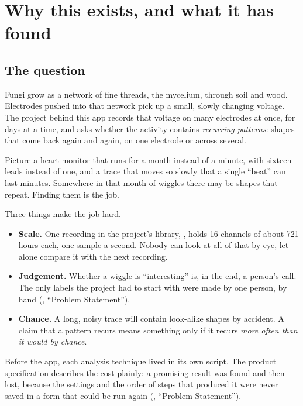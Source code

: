 \chapter{Why this exists, and what it has found}\label{ch:why}
\section{The question}\label{sec:why-question}
Fungi grow as a network of fine threads, the mycelium, through soil and wood. Electrodes
pushed into that network pick up a small, slowly changing voltage. The project behind this
app records that voltage on many electrodes at once, for days at a time, and asks whether
the activity contains \emph{recurring patterns}: shapes that come back again and again, on
one electrode or across several.

\begin{plainterms}
Picture a heart monitor that runs for a month instead of a minute, with sixteen leads
instead of one, and a trace that moves so slowly that a single ``beat'' can last minutes.
Somewhere in that month of wiggles there may be shapes that repeat. Finding them is the
job.
\end{plainterms}

Three things make the job hard.
\begin{itemize}
  \item \textbf{Scale.} One recording in the project's library, ,
    holds 16 channels of about 721 hours each, one sample a second. Nobody can look at all
    of that by eye, let alone compare it with the next recording.
  \item \textbf{Judgement.} Whether a wiggle is ``interesting'' is, in the end, a person's
    call. The only labels the project had to start with were made by one person, by hand
    (, ``Problem Statement'').
  \item \textbf{Chance.} A long, noisy trace will contain look-alike shapes by accident. A
    claim that a pattern recurs means something only if it recurs \emph{more often than it
    would by chance}.
\end{itemize}

Before the app, each analysis technique lived in its own script. The product
specification describes the cost plainly: a promising result was found and then lost,
because the settings and the order of steps that produced it were never saved in a form
that could be run again (, ``Problem Statement'').

